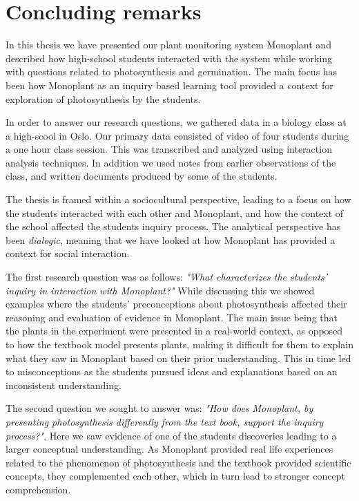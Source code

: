 \chapter{Concluding remarks}
In this thesis we have presented our plant monitoring system Monoplant and described how high-school students interacted with the system while working with questions related to photosynthesis and germination. The main focus has been how Monoplant as an inquiry based learning tool provided a context for exploration of photosynthesis by the students. 

In order to answer our research questions, we gathered data in a biology class at a high-scool in Oslo. Our primary data consisted of video of four students during a one hour class session. This was transcribed and analyzed using interaction analysis techniques. In addition we used notes from earlier observations of the class, and written documents produced by some of the students. 

The thesis is framed within a sociocultural perspective, leading to a focus on how the students interacted with each other and Monoplant, and how the context of the school affected the students inquiry process. The analytical perspective has been \emph{dialogic}, meaning that we have looked at how Monoplant has provided a context for social interaction. 

The first research question was as follows: \emph{"What characterizes the students’ inquiry in interaction with Monoplant?"} While discussing this we showed examples where the students' preconceptions about photosynthesis affected their reasoning and evaluation of evidence in Monoplant. The main issue being that the plants in the experiment were presented in a real-world context, as opposed to how the textbook model presents plants, making it difficult for them to explain what they saw in Monoplant based on their prior understanding. This in time led to misconceptions as the students pursued ideas and explanations based on an inconsistent understanding.


The second question we sought to answer was: \emph{"How does Monoplant, by presenting photosynthesis differently from the text book, support the inquiry process?"}. Here we saw evidence of one of the students discoveries leading to a larger conceptual understanding. As Monoplant provided real life experiences related to the phenomenon of photosynthesis and the textbook provided scientific concepts, they complemented each other, which in turn lead to stronger concept comprehension. 

